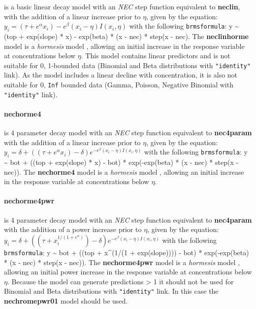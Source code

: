 \documentclass[
  shortnames]{jss}
\begin{document}
is a basic linear decay model with an \emph{NEC} step function equivalent to \textbf{neclin}, with the addition of a linear increase prior to \(\eta\), given by the equation:
\(y_i = (\tau + e^{\alpha} x_i) - e^{\beta} \left(x_i - \eta \right) I(x_i, \eta)\)
with the following \texttt{brmsformula}: y \textasciitilde{} (top + exp(slope) * x) - exp(beta) * (x - nec) * step(x - nec). The \textbf{neclinhorme} model is a \emph{hormesis} model \citep{Mattson2008}, allowing an initial increase in the response variable at concentrations below \(\eta\). This model contains linear predictors and is not suitable for 0, 1-bounded data (Binomial and Beta distributions with \texttt{"identity"} link). As the model includes a linear decline with concentration, it is also not suitable for 0, \texttt{Inf} bounded data (Gamma, Poisson, Negative Binomial with \texttt{"identity"} link).

\hypertarget{nechorme4}{%
\paragraph{nechorme4}\label{nechorme4}}

is 4 parameter decay model with an \emph{NEC} step function equivalent to \textbf{nec4param} with the addition of a linear increase prior to \(\eta\), given by the equation:
\(y_i = \delta + ((\tau + e^{\alpha} x_i) - \delta ) e^{-e^{\beta} \left(x_i - \eta \right) I(x_i, \eta)}\)
with the following \texttt{brmsformula}: y \textasciitilde{} bot + ((top + exp(slope) * x) - bot) * exp(-exp(beta) * (x - nec) * step(x - nec)). The \textbf{nechorme4} model is a \emph{hormesis} model \citep{Mattson2008}, allowing an initial increase in the response variable at concentrations below \(\eta\).

\hypertarget{nechorme4pwr}{%
\paragraph{nechorme4pwr}\label{nechorme4pwr}}

is 4 parameter decay model with an \emph{NEC} step function equivalent to \textbf{nec4param} with the addition of a power increase prior to \(\eta\), given by the equation:
\(y_i = \delta + ((\tau + x_i^{1/(1+e^{\alpha})}) - \delta) e^{-e^{\beta} \left(x_i - \eta \right) I(x_i, \eta)}\)
with the following \texttt{brmsformula}: y \textasciitilde{} bot + ((top + x\^{}(1/(1 + exp(slope)))) - bot) * exp(-exp(beta) * (x - nec) * step(x - nec)). The \textbf{nechorme4pwr} model is a \emph{hormesis} model \citep{Mattson2008}, allowing an initial power increase in the response variable at concentrations below \(\eta\). Because the model can generate predictions \textgreater{} 1 it should not be used for Binomial and Beta distributions with \texttt{"identity"} link. In this case the \textbf{nechromepwr01} model should be used.
\end{document}
